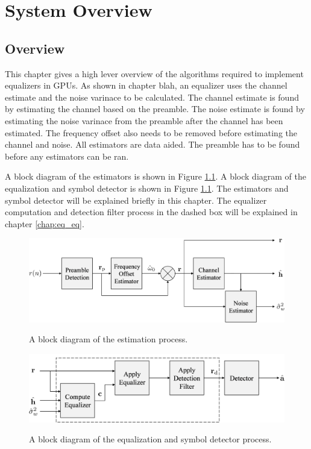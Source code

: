 

\chapter{System Overview}
\label{sec:systemOverview}

\section{Overview}
This chapter gives a high lever overview of the algorithms required to implement equalizers in GPUs. 
As shown in chapter blah, an equalizer uses the channel estimate and the noise varinace to be calculated.
The channel estimate is found by estimating the channel based on the preamble.
The noise estimate is found by estimating the noise varinace from the preamble after the channel has been estimated.
The frequency offset also needs to be removed before estimating the channel and noise.
All estimators are data aided. The preamble has to be found before any estimators can be ran.


A block diagram of the estimators is shown in Figure \ref{fig:estimatorBlock}.
A block diagram of the equalization and symbol detector is shown in Figure \ref{fig:estimatorBlock}.
The estimators and symbol detector will be explained briefly in this chapter.
The equalizer computation and detection filter process in the dashed box will be explained in chapter \ref{chap:eq_eq}.
\begin{figure}
	\caption{A block diagram of the estimation process.}
	\centering\includegraphics[width=10.33in/100*55]{figures/systemOverview/estimatorBlock.pdf}
	\label{fig:estimatorBlock}
\end{figure}
\begin{figure}
	\caption{A block diagram of the equalization and symbol detector process.}
	\centering\includegraphics[width=9.35in/100*55]{figures/systemOverview/ProcessingBlock.pdf}
	\label{fig:ProcessingBlock}
\end{figure}

